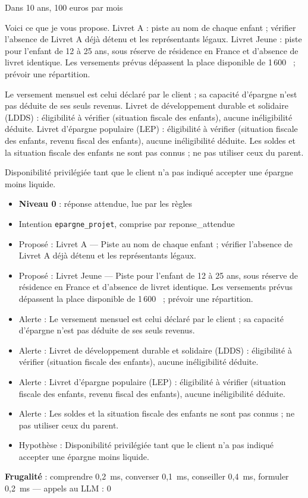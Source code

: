 \documentclass[11pt,a4paper]{article}
\newcommand{\frugal}[1]{{\scriptsize\color{darkgray}\textbf{Frugalité} : #1}\par\medskip}
\begin{document}
\begin{client}Dans 10 ans, 100 euros par mois\end{client}
\begin{assistant}Voici ce que je vous propose. Livret A : piste au nom de chaque enfant ; vérifier l'absence de Livret A déjà détenu et les représentants légaux. Livret Jeune : piste pour l'enfant de 12 à 25 ans, sous réserve de résidence en France et d'absence de livret identique. Les versements prévus dépassent la place disponible de 1\,600~\texteuro{} ; prévoir une répartition.\par Le versement mensuel est celui déclaré par le client ; sa capacité d'épargne n'est pas déduite de ses seuls revenus. Livret de développement durable et solidaire (LDDS) : éligibilité à vérifier (situation fiscale des enfants), aucune inéligibilité déduite. Livret d'épargne populaire (LEP) : éligibilité à vérifier (situation fiscale des enfants, revenu fiscal des enfants), aucune inéligibilité déduite. Les soldes et la situation fiscale des enfants ne sont pas connus ; ne pas utiliser ceux du parent.\par Disponibilité privilégiée tant que le client n'a pas indiqué accepter une épargne moins liquide.\end{assistant}
\begin{pourquoi}
\begin{itemize}
\item \textbf{Niveau 0} : réponse attendue, lue par les règles
\item Intention \texttt{epargne\_projet}, comprise par reponse\_attendue
\item Proposé : Livret A --- Piste au nom de chaque enfant ; vérifier l'absence de Livret A déjà détenu et les représentants légaux.
\item Proposé : Livret Jeune --- Piste pour l'enfant de 12 à 25 ans, sous réserve de résidence en France et d'absence de livret identique. Les versements prévus dépassent la place disponible de 1\,600~\texteuro{} ; prévoir une répartition.
\item Alerte : Le versement mensuel est celui déclaré par le client ; sa capacité d'épargne n'est pas déduite de ses seuls revenus.
\item Alerte : Livret de développement durable et solidaire (LDDS) : éligibilité à vérifier (situation fiscale des enfants), aucune inéligibilité déduite.
\item Alerte : Livret d'épargne populaire (LEP) : éligibilité à vérifier (situation fiscale des enfants, revenu fiscal des enfants), aucune inéligibilité déduite.
\item Alerte : Les soldes et la situation fiscale des enfants ne sont pas connus ; ne pas utiliser ceux du parent.
\item Hypothèse : Disponibilité privilégiée tant que le client n'a pas indiqué accepter une épargne moins liquide.
\end{itemize}
\end{pourquoi}
\frugal{comprendre 0,2~ms, converser 0,1~ms, conseiller 0,4~ms, formuler 0,2~ms --- appels au LLM : 0}
\end{document}
